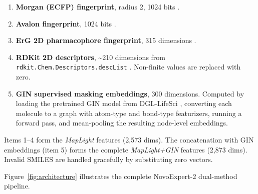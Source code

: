 \documentclass[11pt]{article}
\begin{document}
\begin{enumerate}
    \item \textbf{Morgan (ECFP) fingerprint}, radius 2, 1024 bits \citep{rogers2010extended}.
    \item \textbf{Avalon fingerprint}, 1024 bits \citep{gedeck2006qsar}.
    \item \textbf{ErG 2D pharmacophore fingerprint}, 315 dimensions \citep{stiefl2006erg}.
    \item \textbf{RDKit 2D descriptors}, \textasciitilde 210 dimensions from \texttt{rdkit.Chem.Descriptors.descList} \citep{landrum2013rdkit}. Non-finite values are replaced with zero.
    \item \textbf{GIN supervised masking embeddings}, 300 dimensions. Computed by loading the pretrained GIN model from DGL-LifeSci \citep{li2021dgllife, hu2020gin}, converting each molecule to a graph with atom-type and bond-type featurizers, running a forward pass, and mean-pooling the resulting node-level embeddings.
\end{enumerate}

Items 1--4 form the \emph{MapLight} features (2{,}573 dims). The concatenation with GIN embeddings (item 5) forms the complete \emph{MapLight+GIN} features (2{,}873 dims). Invalid SMILES are handled gracefully by substituting zero vectors.

Figure~\ref{fig:architecture} illustrates the complete NovoExpert-2 dual-method pipeline.
\end{document}
